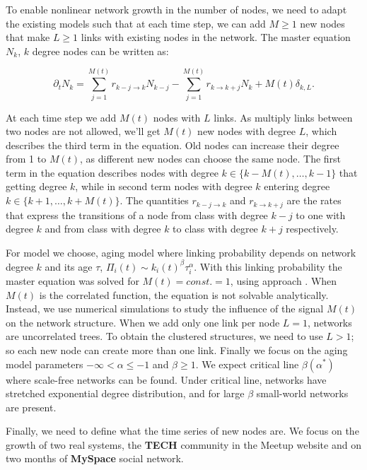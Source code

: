 To enable nonlinear network growth in the number of nodes, we need to adapt the existing models such that at each time step, we can add $M\geq1$ new nodes that make $L\geq1$ links with existing nodes in the network. The master equation $N_k$, $k$ degree nodes can be written as: 

\begin{equation}
\partial_{t}N_{k}=\sum^{M(t)}_{j=1}r_{k-j\longrightarrow k}N_{k-j}-\sum^{M(t)}_{j=1}r_{k\longrightarrow k+j}N_{k}+M(t)\delta_{k,L} . \label{eq:aging_master}  
\end{equation}

At each time step we add $M(t)$ nodes with $L$ links. As multiply links between two nodes are not allowed, we'll get $M(t)$ new nodes with degree $L$, which describes the third term in the equation. Old nodes can increase their degree from 1 to $M(t)$, as different new nodes can choose the same node. The first term in the equation describes nodes with degree $k\in\{k-M(t),\ldots, k-1\}$ that getting degree $k$, while in second term nodes with degree $k$ entering degree  $k\in\{k+1,\ldots, k+M(t)\}$. The quantities $r_{k-j\longrightarrow k}$ and $r_{k\longrightarrow k+j}$ are the rates that express the transitions of a node from class with degree $k-j$ to one with degree $k$ and from class with degree $k$ to class with degree $k+j$ respectively.  

For model we choose, aging model where linking probability depends on network degree $k$ and its age $\tau$, $\Pi_{i}(t)\sim k_{i}(t)^{\beta}\tau_{i}^{\alpha}$. With this linking probability the master equation was solved for $M(t)=const.=1$, using  approach \cite{dorogovtsev2001b}. When $M(t)$ is the correlated function, the equation is not solvable analytically. Instead, we use numerical simulations to study the influence of the signal $M(t)$ on the network structure. When we add only one link per node $L=1$, networks are uncorrelated trees. To obtain the clustered structures, we need to use $L>1$; so each new node can create more than one link. Finally we focus on the aging model parameters $-\infty<\alpha\leq-1$ and $\beta\geq1$. We expect critical line $\beta(\alpha^{*})$ where scale-free networks can be found. Under critical line, networks have stretched exponential degree distribution, and for large $\beta$ small-world networks are present. 

Finally, we need to define what the time series of new nodes are. We focus on the growth of two real systems, the \textbf{TECH} \cite{smiljanic2017associative} community in the Meetup website and on two months of \textbf{MySpace} \cite{suvakov2013} social network. 


